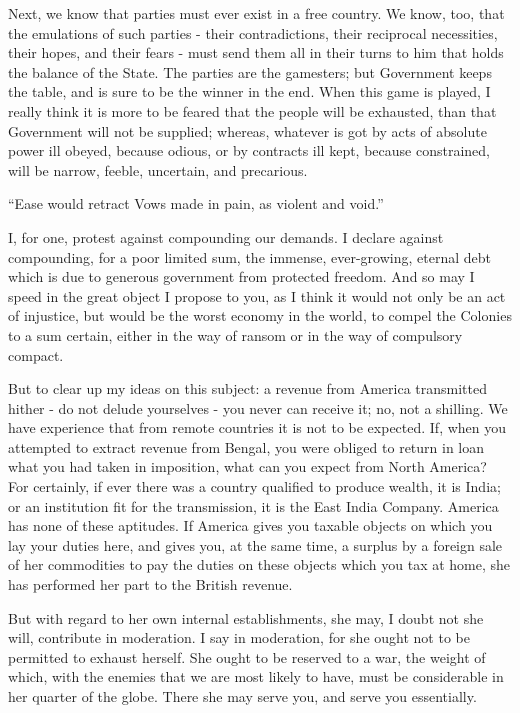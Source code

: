 Next, we know that parties must ever exist in a free country. We know, too, that the emulations of such parties - their contradictions, their reciprocal necessities, their hopes, and their fears - must send them all in their turns to him that holds the balance of the State. The parties are the gamesters; but Government keeps the table, and is sure to be the winner in the end. When this game is played, I really think it is more to be feared that the people will be exhausted, than that Government will not be supplied; whereas, whatever is got by acts of absolute power ill obeyed, because odious, or by contracts ill kept, because constrained, will be narrow, feeble, uncertain, and precarious.\par

“Ease would retract Vows made in pain, as violent and void.”\par

I, for one, protest against compounding our demands. I declare against compounding, for a poor limited sum, the immense, ever-growing, eternal debt which is due to generous government from protected freedom. And so may I speed in the great object I propose to you, as I think it would not only be an act of injustice, but would be the worst economy in the world, to compel the Colonies to a sum certain, either in the way of ransom or in the way of compulsory compact.\par

But to clear up my ideas on this subject: a revenue from America transmitted hither - do not delude yourselves - you never can receive it; no, not a shilling. We have experience that from remote countries it is not to be expected. If, when you attempted to extract revenue from Bengal, you were obliged to return in loan what you had taken in imposition, what can you expect from North America? For certainly, if ever there was a country qualified to produce wealth, it is India; or an institution fit for the transmission, it is the East India Company. America has none of these aptitudes. If America gives you taxable objects on which you lay your duties here, and gives you, at the same time, a surplus by a foreign sale of her commodities to pay the duties on these objects which you tax at home, she has performed her part to the British revenue.\par

But with regard to her own internal establishments, she may, I doubt not she will, contribute in moderation. I say in moderation, for she ought not to be permitted to exhaust herself. She ought to be reserved to a war, the weight of which, with the enemies that we are most likely to have, must be considerable in her quarter of the globe. There she may serve you, and serve you essentially.\par

